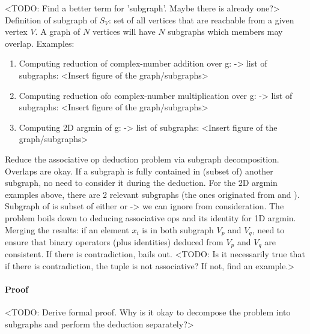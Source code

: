 <TODO: Find a better term for 'subgraph'. Maybe there is already one?> \\

Definition of subgraph of $S_V$: set of all vertices that are reachable from a given vertex $V$. A graph of $N$ vertices will have $N$ subgraphs which members may overlap. Examples:
\begin{enumerate}
 \item Computing reduction of complex-number addition over g:  -> list of subgraphs:  <Insert figure of the graph/subgraphs>
 \item Computing reduction ofo complex-number multiplication over g:  -> list of subgraphs:  <Insert figure of the graph/subgraphs>
 \item Computing 2D argmin of g:  -> list of subgraphs:  <Insert figure of the graph/subgraphs>
\end{enumerate}

Reduce the associative op deduction problem via subgraph decomposition. Overlaps are okay. If a subgraph is fully contained in (subset of) another subgraph, no need to consider it during the deduction. For the 2D argmin examples above, there are 2 relevant subgraphs (the ones originated from  and ). Subgraph of  is subset of either  or  -> we can ignore  from consideration. The problem boils down to deducing associative ops and its identity for 1D argmin. Merging the results: if an element $x_i$ is in both subgraph $V_p$ and $V_q$, need to ensure that binary operators (plus identities) deduced from $V_p$ and $V_q$ are consistent. If there is contradiction, bails out. <TODO: Is it necessarily true that if there is contradiction, the tuple is not associative? If not, find an example.> \\

\paragraph{Proof}
<TODO: Derive formal proof. Why is it okay to decompose the problem into subgraphs and perform the deduction separately?> \\
